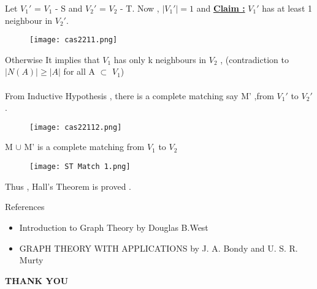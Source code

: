 \documentclass[12pt]{beamer}
\begin{document}
\begin{frame}
Let $V_1'$ = $V_1$ - S and $V_2'$ = $V_2$ - T.
Now , $|V_1'| = 1$ and 
\underline{\textbf{Claim :}} $V_1'$ has at least 1 neighbour in $V_2'$.\\\begin{figure}[h]
\texttt{[image: cas2211.png]}
\end{figure}
Otherwise 
It implies that $V_1$ has only k neighbours in $V_2$ , (contradiction to  $|N(A)| \geq |A|$ for all A $\subset$ $V_1$)\\~\\

From Inductive Hypothesis , there is a complete matching say M' ,from $V_1'$ to $V_2'$ .

\end{frame}

\begin{frame}
\begin{figure}[h]
\texttt{[image: cas22112.png]}
\end{figure}
M $\cup$ M' is a complete matching from $V_1$ to $V_2$
\begin{figure}[h]
\texttt{[image: ST Match 1.png]}
\end{figure}

Thus , Hall's Theorem is proved . 
\end{frame}

\begin{frame}{References}
        \begin{itemize}
            \item Introduction to Graph Theory by Douglas B.West
            \item GRAPH THEORY WITH APPLICATIONS by J. A. Bondy and U. S. R. Murty

        \end{itemize}
    \end{frame}

\begin{frame}
\LARGE{\textbf{THANK YOU}} 
\end{frame}
\end{document}

